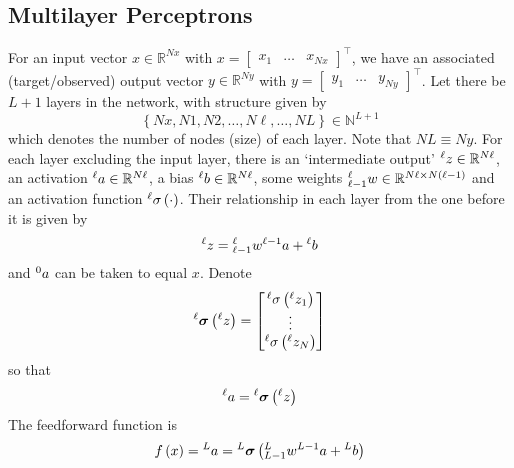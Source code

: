 \documentclass[11pt]{report} %
\begin{document}
\subsection{Multilayer Perceptrons}

For an input vector $x\in\mathbb{R}^{Nx}$ with $x=\begin{bmatrix}x_{1} & \dots & x_{Nx}\end{bmatrix}^{\top}$, we have an associated (target/observed) output vector $y\in\mathbb{R}^{Ny}$ with $y=\begin{bmatrix}y_{1} & \dots & y_{Ny}\end{bmatrix}^{\top}$. Let there be $L + 1$ layers in the network, with structure given by
\begin{equation}
\left\{Nx,N1,N2,\dots,N\ell,\dots,NL\right\} \in \mathbb{N}^{L + 1}
\end{equation}
which denotes the number of nodes (size) of each layer. Note that $NL\equiv Ny$. For each layer excluding the input layer, there is an `intermediate output' $\mathstrut^{\ell}z\in\mathbb{R}^{N\ell}$, an activation $\mathstrut^{\ell}a\in\mathbb{R}^{N\ell}$, a bias $\mathstrut^{\ell}b\in\mathbb{R}^{N\ell}$, some weights $\mathstrut_{\ell-1}^{\ell}w\in\mathbb{R}^{N\ell\times N\left(\ell-1\right)}$ and an activation function $\mathstrut^{\ell}\sigma\left(\cdot\right)$. Their relationship in each layer from the one before it is given by
\begin{equation}
\mathstrut^{\ell}z=\mathstrut_{\ell-1}^{\ell}w\mathstrut^{\ell-1}a+\mathstrut^{\ell}b
\end{equation}
and $\mathstrut^{0}a$ can be taken to equal $x$. Denote
\begin{equation}
\mathstrut^{\ell}\boldsymbol{\sigma}\left(\mathstrut^{\ell}z\right)=\begin{bmatrix}\mathstrut^{\ell}\sigma\left(\mathstrut^{\ell} z_{1}\right)\\
\vdots\\
\mathstrut^{\ell}\sigma\left(\mathstrut^{\ell}z_{N}\right)
\end{bmatrix}
\end{equation}
so that
\begin{equation}
\mathstrut^{\ell}a=\mathstrut^{\ell}\boldsymbol{\sigma}\left(\mathstrut^{\ell}z\right)
\end{equation}
The feedforward function is
\begin{equation}
f\left(x\right)=\mathstrut^{L}a=\mathstrut^{L}\boldsymbol{\sigma}\left(\mathstrut_{L-1}^{L}w\mathstrut^{L-1}a+\mathstrut^{L}b\right)
\end{equation}
\end{document}
